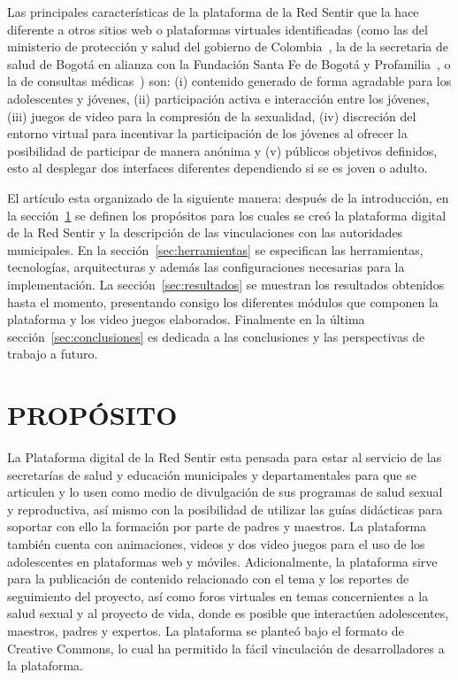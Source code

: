 \documentclass[journal,transmag]{IEEEtran}
\begin{document}
Las principales características de la plataforma de la Red Sentir que la hace diferente a otros sitios web o plataformas virtuales identificadas (como las del ministerio de protección y salud del gobierno de Colombia~\cite{PagGob2018}, la de la secretaria de salud de Bogotá en alianza con la Fundación Santa Fe de Bogotá y Profamilia~\cite{Sexperto2018}, o la de consultas médicas~\cite{1DOC3}) son: (i) contenido generado de forma agradable para los adolescentes y jóvenes, (ii) participación activa e interacción entre los jóvenes, (iii) juegos de video para la compresión de la sexualidad, (iv) discreción del entorno virtual para incentivar la participación de los jóvenes al ofrecer la posibilidad de participar de manera anónima y (v) públicos objetivos definidos, esto al desplegar dos interfaces diferentes dependiendo si se es joven o adulto.  

El artículo esta organizado de la siguiente manera: después de la introducción, en la sección~\ref{sec:propositos} se definen los propósitos para los cuales se creó la plataforma digital de la Red Sentir y la descripción de las vinculaciones con las autoridades municipales. En la sección~\ref{sec:herramientas} se especifican las herramientas, tecnologías, arquitecturas y además las configuraciones necesarias para la implementación. La sección~\ref{sec:resultados} se muestran los resultados obtenidos hasta el momento, presentando consigo los diferentes módulos que componen la plataforma y los video juegos elaborados. Finalmente en la última sección~\ref{sec:conclusiones} es dedicada a las conclusiones y las perspectivas de trabajo a futuro.

\section{PROPÓSITO}\label{sec:propositos}

La Plataforma digital de la Red Sentir esta pensada para estar al servicio de las secretarías de salud y educación municipales y departamentales para que se articulen y lo usen como medio de divulgación de sus programas de salud sexual y reproductiva, así mismo con la posibilidad de utilizar las guías didácticas para soportar con ello la formación por parte de padres y maestros. La plataforma también cuenta con animaciones, videos y dos video juegos para el uso de los adolescentes en plataformas web y móviles. Adicionalmente, la plataforma sirve para la publicación de contenido relacionado con el tema y los reportes de seguimiento del proyecto, así como foros virtuales en temas concernientes a la salud sexual y al proyecto de vida, donde es posible que interactúen adolescentes, maestros, padres y expertos. La plataforma se planteó bajo el formato de Creative Commons, lo cual ha permitido la fácil vinculación de desarrolladores a la plataforma.
\end{document}
